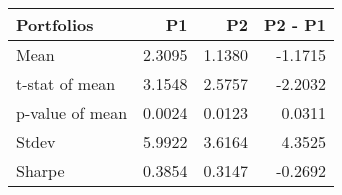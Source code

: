 \begin{tabular}{lrrr}
\toprule
Portfolios & P1 & P2 & P2 - P1 \\
\midrule
Mean & 2.3095 & 1.1380 & -1.1715 \\
t-stat of mean & 3.1548 & 2.5757 & -2.2032 \\
p-value of mean & 0.0024 & 0.0123 & 0.0311 \\
Stdev & 5.9922 & 3.6164 & 4.3525 \\
Sharpe & 0.3854 & 0.3147 & -0.2692 \\
\bottomrule
\end{tabular}
